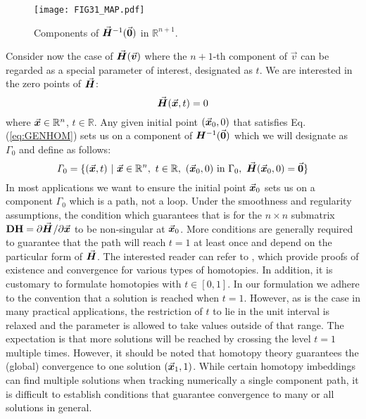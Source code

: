 \begin{figure}[t]
	
	\centering
	\texttt{[image: FIG31\_MAP.pdf]}
	\caption{Components of $\vec{\bm{H}}^{-1}(\vec{\bm{0}})$ in $\mathbb{R}^{n+1}$.}
	\label{fig:FIG31}
\end{figure}

Consider now the case of $\vec{\bm{H}}(\vec{\bm{v}})$ where the $n+1$-th component of 
$\vec{v}$ can be regarded as a special parameter of 
interest, designated as $t$. We are interested in the zero points of 
$\vec{\bm{H}}$:
\begin{equation}
	\vec{\bm{H}}(\vec{\bm{x}},t)=0
	\label{eq:GENHOM}
\end{equation}
\noindent where $\vec{\bm{x}}\in\mathbb{R}^n$, 
$t\in\mathbb{R}$. Any given initial point $(\vec{\bm{x}}_0,0)$ that satisfies Eq.
(\ref{eq:GENHOM}) sets us on a component of $\bm{H}^{-1}(\vec{\bm{0}})$ which we 
will
designate as $\mathit{\Gamma}_0$ and define as follows:
\begin{equation}
	\mathit{\Gamma}_0=\{(\bvec{x},t)\ |\ 
	\bvec{x}\in\mathbb{R}^n,\ t\in\mathbb{R},\ (\bvec{x}_0,0)\ \text{in}\ 
	\Gamma_0,\ \bvec{H}(\bvec{x}_0,0)=\bvec{0}\}
	\label{eq:PATH}
\end{equation}
In most applications we want to ensure the initial point $\vec{\bm{x}}_0$ sets us 
on 
a component $\mathit{\Gamma}_0$ which is a path, not a loop. Under the 
smoothness and regularity assumptions, the condition which guarantees that is 
for
the $n\times n$ submatrix $\mathbf{DH}=\partial \vec{\bm{H}}^{}/\partial \vec{\bm{x}}$ to 
be
non-singular at $\vec{\bm{x}}_0$\cite{Garcia:1980}. More conditions are generally
required to guarantee that the path will reach $t=1$ at least once and 
depend on the particular form of $\vec{\bm{H}}$. The interested reader can refer to
\cite{Allgower:2003}, which provide proofs of existence and convergence for
various types of homotopies. In addition, it is customary to formulate
homotopies with $t\in[0,1]$. In our formulation we adhere to the
convention that a solution is reached when $t=1$. However, as is the case 
in many 
practical applications, the restriction of $t$ to lie in the unit
interval is relaxed and the parameter is allowed to take values outside of that 
range. The expectation is that more solutions will be
reached by crossing the level $t=1$ multiple times. However, it should 
be noted that homotopy theory guarantees the (global) convergence 
to one solution $(\vec{\bm{x}}_1,1)$. While certain homotopy imbeddings can find 
multiple
solutions when tracking numerically a single component
path\cite{Keller:1978,Lin:1987,Sun:1995}, it is difficult to establish
conditions that guarantee convergence to many or all solutions in
general\cite{Sun:1995}. 


